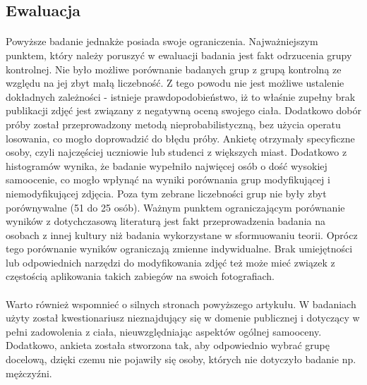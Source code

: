 \documentclass[12pt,a4paper,final,oneside,onecolumn,titlepage]{article}
\begin{document}
\subsection*{\normalsize{\textbf{Ewaluacja}}}
\paragraph{}
Powyższe badanie jednakże posiada swoje ograniczenia. Najważniejszym punktem, który należy poruszyć w ewaluacji badania jest fakt odrzucenia grupy kontrolnej. Nie było możliwe porównanie badanych grup z grupą kontrolną ze względu na jej zbyt małą liczebność. Z tego powodu nie jest możliwe ustalenie dokładnych zależności - istnieje prawdopodobieństwo, iż to właśnie zupełny brak publikacji zdjęć jest związany z negatywną oceną swojego ciała. Dodatkowo dobór próby został przeprowadzony metodą nieprobabilistyczną, bez użycia operatu losowania, co mogło doprowadzić do błędu próby. Ankietę otrzymały specyficzne osoby, czyli najczęściej uczniowie lub studenci z większych miast. Dodatkowo z histogramów wynika, że badanie wypełniło najwięcej osób o dość wysokiej samoocenie, co mogło wpłynąć na wyniki porównania grup modyfikującej i niemodyfikującej zdjęcia. Poza tym zebrane liczebności grup nie były zbyt porównywalne (51 do 25 osób). Ważnym punktem ograniczającym porównanie wyników z dotychczasową literaturą jest fakt przeprowadzenia badania na osobach z innej kultury niż badania wykorzystane w sformuowaniu teorii. Oprócz tego porównanie wyników ograniczają zmienne indywidualne. Brak umiejętności lub odpowiednich narzędzi do modyfikowania zdjęć też może mieć związek z częstością aplikowania takich zabiegów na swoich fotografiach.
\paragraph{}
Warto również wspomnieć o silnych stronach powyższego artykułu. W badaniach użyty został kwestionariusz nieznajdujący się w domenie publicznej i dotyczący w pełni zadowolenia z ciała, nieuwzględniając aspektów ogólnej samooceny. Dodatkowo, ankieta została stworzona tak, aby odpowiednio wybrać grupę docelową, dzięki czemu nie pojawiły się osoby, których nie dotyczyło badanie np. mężczyźni.
\newpage

\end{document}
